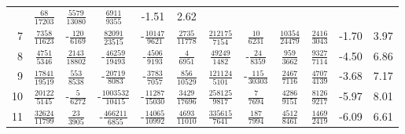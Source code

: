 \begin{sidewaystable}
\begin{tabular}{r|ccccccccc|c@{ -- }c@{\%}}
&  $\frac{              68}{           17203}$
&  $\frac{            5579}{           13080}$
&  $\frac{            6911}{            9355}$
&  -1.51 &  2.62
\\
7
&  $\frac{            7358}{           11623}$
& -$\frac{             120}{            6169}$
&  $\frac{           82091}{           23515}$
& -$\frac{           10147}{            9621}$
&  $\frac{            2735}{           11778}$
&  $\frac{          212175}{            7154}$
&  $\frac{              10}{            6231}$
&  $\frac{           10354}{           24479}$
&  $\frac{            2416}{            3043}$
&  -1.70 &  3.97
\\
8
&  $\frac{            4751}{            5346}$
&  $\frac{            2143}{           18802}$
& -$\frac{           46259}{           19493}$
& -$\frac{            4506}{            9193}$
&  $\frac{               4}{            6951}$
&  $\frac{           49249}{            1482}$
& -$\frac{              24}{            8359}$
&  $\frac{             959}{            3662}$
&  $\frac{            9327}{            7114}$
&  -4.50 &  6.86
\\
9
&  $\frac{           17841}{           19519}$
&  $\frac{             553}{            8538}$
& -$\frac{           20719}{            8083}$
& -$\frac{            3783}{            7057}$
&  $\frac{             856}{           10529}$
&  $\frac{          121124}{            5101}$
& -$\frac{             115}{           30303}$
&  $\frac{            2467}{            7116}$
&  $\frac{            4707}{            4139}$
&  -3.68 &  7.17
\\
10
&  $\frac{           20122}{            5145}$
& -$\frac{               5}{            6272}$
& -$\frac{         1003532}{           10415}$
& -$\frac{           11287}{           15030}$
&  $\frac{            3429}{           17696}$
&  $\frac{          258125}{            9817}$
&  $\frac{               7}{            7694}$
&  $\frac{            4286}{            9151}$
&  $\frac{            8126}{            9217}$
&  -5.97 &  8.01
\\
11
&  $\frac{           32624}{           11799}$
&  $\frac{              23}{            3905}$
& -$\frac{          466211}{            6855}$
& -$\frac{           14065}{           10992}$
&  $\frac{            4693}{           11010}$
&  $\frac{          335615}{            7641}$
&  $\frac{             187}{            7994}$
&  $\frac{            4512}{            8461}$
&  $\frac{            1469}{            2419}$
&  -6.09 &  6.61
\\

\end{tabular}
\end{sidewaystable}
